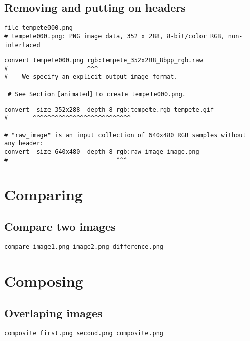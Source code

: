 
\section{Removing and putting on headers}

\begin{lstlisting}
file tempete000.png
# tempete000.png: PNG image data, 352 x 288, 8-bit/color RGB, non-interlaced
\end{lstlisting}
\begin{lstlisting}
convert tempete000.png rgb:tempete_352x288_8bpp_rgb.raw
#                      ^^^
#    We specify an explicit output image format.
\end{lstlisting}
\noindent~\verb|# See Section| \texttt{\ref{animated}} \verb|to create tempete000.png.|
\begin{lstlisting}
convert -size 352x288 -depth 8 rgb:tempete.rgb tempete.gif
#       ^^^^^^^^^^^^^^^^^^^^^^^^^^^

# "raw_image" is an input collection of 640x480 RGB samples without any header:
convert -size 640x480 -depth 8 rgb:raw_image image.png
#                              ^^^
\end{lstlisting}



\chapter{Comparing}

\section{Compare two images}

\begin{lstlisting}
compare image1.png image2.png difference.png 
\end{lstlisting}


\chapter{Composing}

\section{Overlaping images}

\begin{lstlisting}
composite first.png second.png composite.png
\end{lstlisting}

